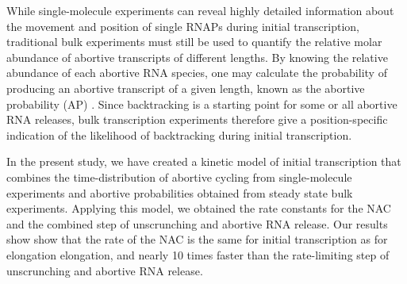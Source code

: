 While single-molecule experiments can reveal highly detailed information about
the movement and position of single RNAPs during initial transcription,
traditional bulk experiments must still be used to quantify the relative molar
abundance of abortive transcripts of different lengths. By knowing the
relative abundance of each abortive RNA species, one may calculate the
probability of producing an abortive transcript of a given length, known as
the abortive probability (AP) \cite{hsu_promoter_2002, hsu_quantitative_1996}.
Since backtracking is a starting point for some or all abortive RNA releases,
bulk transcription experiments therefore give a position-specific indication
of the likelihood of backtracking during initial transcription.

In the present study, we have created a kinetic model of initial transcription
that combines the time-distribution of abortive cycling from single-molecule
experiments and abortive probabilities obtained from steady state bulk
experiments. Applying this model, we obtained the rate constants for the NAC
and the combined step of unscrunching and abortive RNA release. Our results
show show that the rate of the NAC is the same for initial transcription as
for elongation elongation, and nearly 10 times faster than the rate-limiting
step of unscrunching and abortive RNA release.
